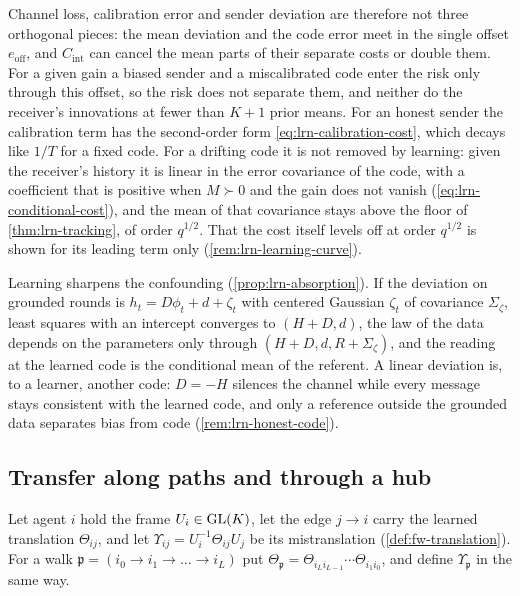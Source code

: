 Channel loss, calibration error and sender deviation are therefore not three orthogonal pieces: the mean deviation and the code error meet in the single offset $e_{\mathrm{off}}$, and $C_{\mathrm{int}}$ can cancel the mean parts of their separate costs or double them. For a given gain a biased sender and a miscalibrated code enter the risk only through this offset, so the risk does not separate them, and neither do the receiver's innovations at fewer than $K+1$ prior means. For an honest sender the calibration term has the second-order form \cref{eq:lrn-calibration-cost}, which decays like $1/T$ for a fixed code. For a drifting code it is not removed by learning: given the receiver's history it is linear in the error covariance of the code, with a coefficient that is positive when $M\succ0$ and the gain does not vanish (\cref{eq:lrn-conditional-cost}), and the mean of that covariance stays above the floor of \cref{thm:lrn-tracking}, of order $q^{1/2}$. That the cost itself levels off at order $q^{1/2}$ is shown for its leading term only (\cref{rem:lrn-learning-curve}).

Learning sharpens the confounding (\cref{prop:lrn-absorption}). If the deviation on grounded rounds is $h_t=D\phi_t+d+\zeta_t$ with centered Gaussian $\zeta_t$ of covariance $\Sigma_\zeta$, least squares with an intercept converges to $(H+D,d)$, the law of the data depends on the parameters only through $(H+D,d,R+\Sigma_\zeta)$, and the reading at the learned code is the conditional mean of the referent. A linear deviation is, to a learner, another code: $D=-H$ silences the channel while every message stays consistent with the learned code, and only a reference outside the grounded data separates bias from code (\cref{rem:lrn-honest-code}).

\subsection{Transfer along paths and through a hub}\label{sec:lrn-transfer}

Let agent $i$ hold the frame $U_i\in\mathrm{GL}(K)$, let the edge $j\to i$ carry the learned translation $\Theta_{ij}$, and let $\Upsilon_{ij}=U_i^{-1}\Theta_{ij}U_j$ be its mistranslation (\cref{def:fw-translation}). For a walk $\mathfrak p=(i_0\to i_1\to\dots\to i_L)$ put $\Theta_{\mathfrak p}=\Theta_{i_Li_{L-1}}\cdots\Theta_{i_1i_0}$, and define $\Upsilon_{\mathfrak p}$ in the same way.

